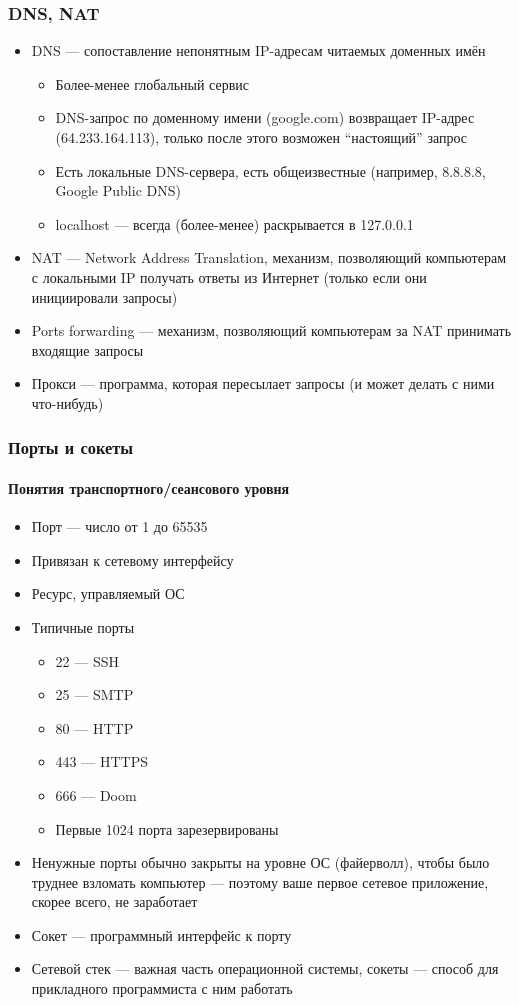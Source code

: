 \documentclass[xetex,mathserif,serif]{beamer}
\begin{document}
	\begin{frame}
		\frametitle{DNS, NAT}
		\begin{itemize}
			\item DNS --- сопоставление непонятным IP-адресам читаемых доменных имён
			\begin{itemize}
				\item Более-менее глобальный сервис
				\item DNS-запрос по доменному имени (google.com) возвращает IP-адрес (64.233.164.113), только после этого возможен ``настоящий'' запрос
				\item Есть локальные DNS-сервера, есть общеизвестные (например, 8.8.8.8, Google Public DNS)
				\item localhost --- всегда (более-менее) раскрывается в 127.0.0.1
			\end{itemize}
			\item NAT --- Network Address Translation, механизм, позволяющий компьютерам с локальными IP получать ответы из Интернет (только если они инициировали запросы)
			\item Ports forwarding --- механизм, позволяющий компьютерам за NAT принимать входящие запросы
			\item Прокси --- программа, которая пересылает запросы (и может делать с ними что-нибудь)
		\end{itemize}
	\end{frame}

	\begin{frame}
		\frametitle{Порты и сокеты}
		\framesubtitle{Понятия транспортного/сеансового уровня}
		\begin{itemize}
			\item Порт --- число от 1 до 65535
			\item Привязан к сетевому интерфейсу
			\item Ресурс, управляемый ОС
			\item Типичные порты
			\begin{itemize}
				\item 22 --- SSH
				\item 25 --- SMTP
				\item 80 --- HTTP
				\item 443 --- HTTPS
				\item 666 --- Doom
				\item Первые 1024 порта зарезервированы
			\end{itemize}
			\item Ненужные порты обычно закрыты на уровне ОС (файерволл), чтобы было труднее взломать компьютер --- поэтому ваше первое сетевое приложение, скорее всего, не заработает
			\item Сокет --- программный интерфейс к порту
			\item Сетевой стек --- важная часть операционной системы, сокеты --- способ для прикладного программиста с ним работать
		\end{itemize}
	\end{frame}
\end{document}
